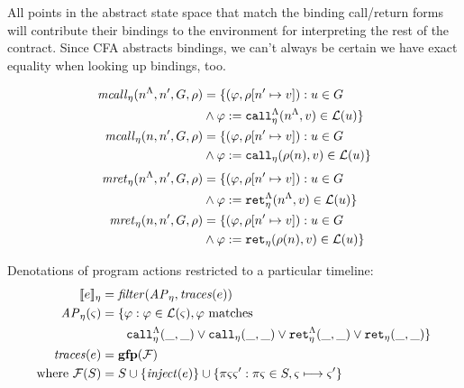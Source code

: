 \documentclass[preprint,onecolumn,9pt]{sigplanconf} %
\begin{document}
All points in the abstract state space that match the binding call/return forms will contribute their bindings to the environment for interpreting the rest of the contract.
%
Since CFA abstracts bindings, we can't always be certain we have exact equality when looking up bindings, too.

\begin{align*}
  \matchcall_\mtimeline(\mtoplevelname, \mname', \mgraph, \menv) &=
    \setbuild{(\ltlprop, \menv[\mname' \mapsto \mval])}
             {\mnode \in \mgraph\\
               &\wedge \ltlprop:=\aptopcall{\mtoplevelname}{\mval}{\mtimeline} \in \labelof(\mnode)}
\\
  \matchcall_\mtimeline(\mname, \mname', \mgraph, \menv) &=
    \setbuild{(\ltlprop, \menv[\mname' \mapsto \mval])}
             {\mnode \in \mgraph\\
               &\wedge \ltlprop:=\apvcall{\menv(\mname)}{\mval}{\mtimeline} \in \labelof(\mnode)}
%
\\[2pt]
  \matchret_\mtimeline(\mtoplevelname, \mname', \mgraph, \menv) &=
    \setbuild{(\ltlprop, \menv[\mname' \mapsto \mval])}
             {\mnode \in \mgraph\\
               &\wedge \ltlprop:=\aptopret{\mtoplevelname}{\mval}{\mtimeline} \in \labelof(\mnode)}
\\
  \matchret_\mtimeline(\mname, \mname', \mgraph, \menv) &=
    \setbuild{(\ltlprop, \menv[\mname' \mapsto \mval])}
             {\mnode \in \mgraph\\
               &\wedge \ltlprop:=\apvret{\menv(\mname)}{\mval}{\mtimeline} \in \labelof(\mnode)}
\end{align*}

Denotations of program actions restricted to a particular timeline:
\begin{align*}
  [\![ e ]\!]_\eta &= \mathit{filter}(\mathit{AP}_\eta, \mathit{traces}(e)) \\
  \mathit{AP}_\eta(\varsigma) &= \{\varphi : \varphi \in {\mathcal L}(\varsigma), \varphi \text{ matches }\\
                               &\qquad{\tt call}_{\eta}^{\Lambda}(\_,\_) \vee {\tt call}_{\eta}(\_,\_) \vee {\tt ret}_{\eta}^{\Lambda}(\_,\_) \vee {\tt ret}_{\eta}(\_,\_)\} \\
  \mathit{traces}(e) &= \mathbf{gfp}({\mathcal F}) \\
  \text{where } {\mathcal F}(S) &= S \cup \{\mathit{inject}(e)\} \cup \{\pi \varsigma \varsigma' : \pi \varsigma \in S, \varsigma \mathrel{\longmapsto} \varsigma'\}
\end{align*}
\end{document}
